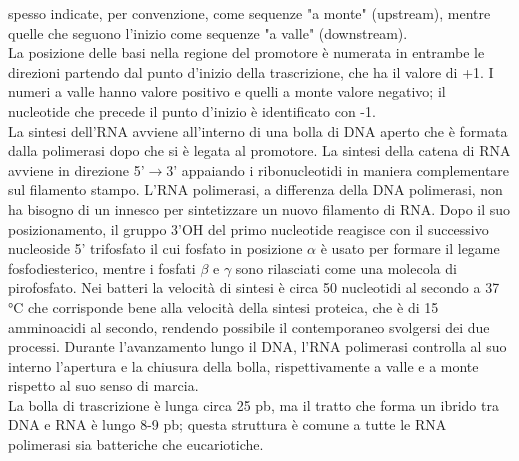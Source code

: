\documentclass{article}
\begin{document}
spesso indicate, per convenzione, come sequenze "a monte" (upstream), mentre
quelle che seguono l'inizio come sequenze "a valle" (downstream). \\
La posizione delle basi nella regione del promotore è numerata in entrambe le direzioni partendo dal punto d'inizio della trascrizione, che
ha il valore di +1. I numeri a valle hanno valore positivo e quelli a monte valore
negativo; il nucleotide che precede il punto d'inizio è identificato con -1.\\
La sintesi dell'RNA avviene all'interno di una bolla
di DNA aperto che è formata dalla polimerasi dopo che si è legata al promotore. La sintesi della catena di RNA avviene in direzione 5'$\rightarrow$3' appaiando
i ribonucleotidi in maniera complementare sul filamento stampo. L'RNA polimerasi, a differenza della DNA polimerasi, non ha bisogno di un innesco per
sintetizzare un nuovo filamento di RNA. Dopo il suo posizionamento, il gruppo
3'OH del primo nucleotide reagisce con il successivo nucleoside 5' trifosfato il
cui fosfato in posizione $\alpha$ è usato per formare il legame fosfodiesterico, mentre i
fosfati $\beta$ e $\gamma$ sono rilasciati come una molecola di pirofosfato.
Nei batteri la velocità di sintesi è circa 50 nucleotidi al secondo a 37 °C che
corrisponde bene alla velocità della sintesi proteica, che è di 15 amminoacidi al
secondo, rendendo possibile il contemporaneo svolgersi dei due processi. Durante l'avanzamento lungo il DNA, l'RNA polimerasi controlla al suo interno
l'apertura e la chiusura della bolla, rispettivamente a valle e a monte rispetto al
suo senso di marcia.\\
La bolla di trascrizione è lunga circa 25 pb, ma il tratto che forma un ibrido
tra DNA e RNA è lungo 8-9 pb; questa struttura è comune a tutte le RNA polimerasi sia batteriche che eucariotiche. 
\end{document}
